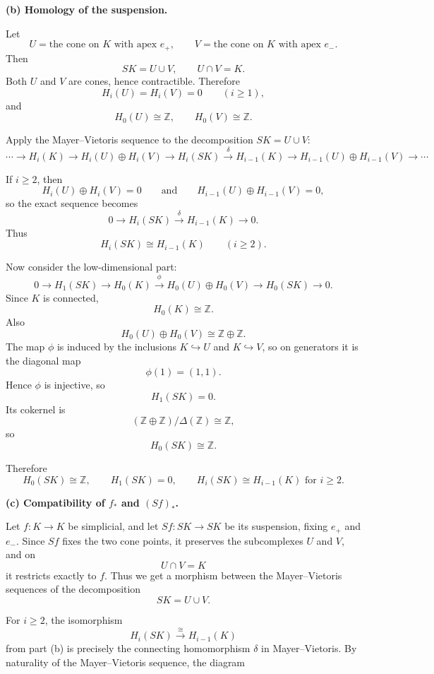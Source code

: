 \begin{solution}
\par

\textbf{(b) Homology of the suspension.}

Let
\[
U=\text{the cone on }K\text{ with apex }e_+,
\qquad
V=\text{the cone on }K\text{ with apex }e_-.
\]
Then
\[
SK=U\cup V,
\qquad
U\cap V=K.
\]
Both \(U\) and \(V\) are cones, hence contractible. Therefore
\[
H_i(U)=H_i(V)=0 \qquad (i\ge 1),
\]
and
\[
H_0(U)\cong \mathbb Z,\qquad H_0(V)\cong \mathbb Z.
\]

Apply the Mayer--Vietoris sequence to the decomposition \(SK=U\cup V\):
\[
\cdots \to H_i(K)\to H_i(U)\oplus H_i(V)\to H_i(SK)\xrightarrow{\delta} H_{i-1}(K)\to H_{i-1}(U)\oplus H_{i-1}(V)\to \cdots
\]

If \(i\ge 2\), then
\[
H_i(U)\oplus H_i(V)=0
\qquad\text{and}\qquad
H_{i-1}(U)\oplus H_{i-1}(V)=0,
\]
so the exact sequence becomes
\[
0\to H_i(SK)\xrightarrow{\delta} H_{i-1}(K)\to 0.
\]
Thus
\[
\boxed{H_i(SK)\cong H_{i-1}(K)\qquad (i\ge 2).}
\]

Now consider the low-dimensional part:
\[
0\to H_1(SK)\to H_0(K)\xrightarrow{\phi} H_0(U)\oplus H_0(V)\to H_0(SK)\to 0.
\]
Since \(K\) is connected,
\[
H_0(K)\cong \mathbb Z.
\]
Also
\[
H_0(U)\oplus H_0(V)\cong \mathbb Z\oplus \mathbb Z.
\]
The map \(\phi\) is induced by the inclusions \(K\hookrightarrow U\) and \(K\hookrightarrow V\), so on generators it is the diagonal map
\[
\phi(1)=(1,1).
\]
Hence \(\phi\) is injective, so
\[
H_1(SK)=0.
\]
Its cokernel is
\[
(\mathbb Z\oplus \mathbb Z)/\Delta(\mathbb Z)\cong \mathbb Z,
\]
so
\[
H_0(SK)\cong \mathbb Z.
\]

Therefore
\[
\boxed{H_0(SK)\cong \mathbb Z,\qquad H_1(SK)=0,\qquad H_i(SK)\cong H_{i-1}(K)\text{ for }i\ge 2.}
\]

\par

\textbf{(c) Compatibility of \(f_*\) and \((Sf)_*\).}

Let \(f:K\to K\) be simplicial, and let \(Sf:SK\to SK\) be its suspension, fixing \(e_+\) and \(e_-\). Since \(Sf\) fixes the two cone points, it preserves the subcomplexes \(U\) and \(V\), and on
\[
U\cap V=K
\]
it restricts exactly to \(f\). Thus we get a morphism between the Mayer--Vietoris sequences of the decomposition
\[
SK=U\cup V.
\]

For \(i\ge 2\), the isomorphism
\[
H_i(SK)\xrightarrow{\cong} H_{i-1}(K)
\]
from part (b) is precisely the connecting homomorphism \(\delta\) in Mayer--Vietoris. By naturality of the Mayer--Vietoris sequence, the diagram



\end{solution}
